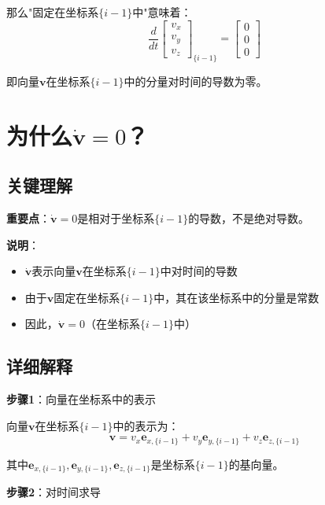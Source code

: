 \documentclass[12pt,a4paper]{article}
\begin{document}
那么"固定在坐标系$\{i-1\}$中"意味着：
\begin{equation}
\frac{d}{dt} \begin{bmatrix} v_x \\ v_y \\ v_z \end{bmatrix}_{\{i-1\}} = \begin{bmatrix} 0 \\ 0 \\ 0 \end{bmatrix}
\end{equation}

即向量$\mathbf{v}$在坐标系$\{i-1\}$中的分量对时间的导数为零。

\section{为什么$\dot{\mathbf{v}} = 0$？}

\subsection{关键理解}

\textbf{重要点}：$\dot{\mathbf{v}} = 0$是相对于坐标系$\{i-1\}$的导数，不是绝对导数。

\textbf{说明}：
\begin{itemize}
\item $\dot{\mathbf{v}}$表示向量$\mathbf{v}$在坐标系$\{i-1\}$中对时间的导数
\item 由于$\mathbf{v}$固定在坐标系$\{i-1\}$中，其在该坐标系中的分量是常数
\item 因此，$\dot{\mathbf{v}} = 0$（在坐标系$\{i-1\}$中）
\end{itemize}

\subsection{详细解释}

\textbf{步骤1}：向量在坐标系中的表示

向量$\mathbf{v}$在坐标系$\{i-1\}$中的表示为：
\begin{equation}
\mathbf{v} = v_x \mathbf{e}_{x,\{i-1\}} + v_y \mathbf{e}_{y,\{i-1\}} + v_z \mathbf{e}_{z,\{i-1\}}
\end{equation}

其中$\mathbf{e}_{x,\{i-1\}}, \mathbf{e}_{y,\{i-1\}}, \mathbf{e}_{z,\{i-1\}}$是坐标系$\{i-1\}$的基向量。

\textbf{步骤2}：对时间求导
\end{document}
